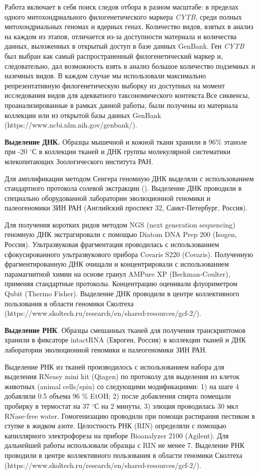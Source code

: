 Работа включает в себя поиск следов отбора в разном масштабе: в пределах одного митохондриального филогенетического маркера \textit{CYTB}, среди полных митохондриальных геномах и ядерных генах. Количество видов, взятых в анализ на каждом из этапов, отличается из-за доступности материала и количества данных, выложенных в открытый доступ в базе данных GenBank. Ген \textit{CYTB} был выбран как самый распространенный филогенетический маркер и, следовательно, дал возможность взять в анализ большое количество подземных и наземных видов. В каждом случае мы использовали максимально репрезентативную филогенетическую выборку из доступных на момент исследования видов для адекватного таксономического контекста.Все сиквенсы, проанализированные в рамках данной работы, были получены из материала коллекции или из открытой базы данных GenBank (https://www.ncbi.nlm.nih.gov/genbank/).

\textbf{Выделение ДНК.} Образцы мышечной и кожной ткани хранили в 96\% этаноле при -20 $^\circ$С в коллекции тканей и ДНК группы молекулярной систематики млекопитающих Зоологического института РАН.  

Для амплификации методом Сенгера геномную ДНК выделяли с использованием стандартного протокола солевой экстракции (\cite{Miller1999}). Выделение ДНК проводили в специально оборудованной лаборатории эволюционной геномики и палеогеномики ЗИН РАН (Английский проспект 32, Санкт-Петербург, Россия).

Для получения коротких ридов методом NGS (next generation sequencing) геномную ДНК экстрагировали с помощью Diatom DNA Prep 200 (Isogen, Россия). Ультразвуковая фрагментация проводилась с использованием сфокусированного ультразвукового прибора Covaris S220 (Covaris). Полученную фрагментированную ДНК очищали и концентрировали с использованием парамагнитной химии на основе гранул AMPure XP (Beckman-Coulter), применяя стандартные протоколы. Концентрацию оценивали флуориметром Qubit (Thermo Fisher). Выделение ДНК проводили в центре коллективного пользования в области геномики Сколтеха (https://www.skoltech.ru/research/en/shared-resources/gcf-2/).

\textbf{Выделение РНК}. Образцы смешанных тканей для получения транскриптомов хранили в фиксаторе intactRNA (Евроген, Россия) в коллекции тканей и ДНК лаборатории эволюционной геномики и палеогеномики ЗИН РАН. 

Выделение РНК из тканей производилось с использованием набора для выделения RNeasy mini kit (Qiagen) по протоколу для выделения из клеток животных (animal cells/spin) со следующими модификациями: 1) на шаге 4 добавляли 0.5 объема 96 \% EtOH; 2) после добавления спирта помещали пробирку в термостат на 37 $^\circ$С на 2 минуты, 3) элюция проводилась 30 мкл RNase-free water. Гомогенизацию проводили при помощи растирания пестиком в ступке в жидком азоте. Целостность РНК (RIN) определяли с помощью капиллярного электрофореза на приборе Bioanalyzer 2100 (Agilent). Для дальнейшей работы использовали образцы с RIN не менее 7. Выделение РНК проводили в центре коллективного пользования в области геномики Сколтеха (https://www.skoltech.ru/research/en/shared-resources/gcf-2/).


